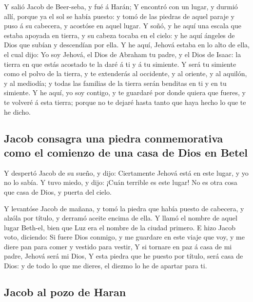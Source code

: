  Y salió Jacob de Beer-seba, y fué á Harán;  Y
encontró con un lugar, y durmió allí, porque ya el sol se había puesto:
y tomó de las piedras de aquel paraje y puso á su cabecera, y acostóse
en aquel lugar.  Y soñó, y he aquí una escala que estaba
apoyada en tierra, y su cabeza tocaba en el cielo: y he aquí ángeles de
Dios que subían y descendían por ella.  Y he aquí, Jehová
estaba en lo alto de ella, el cual dijo: Yo soy Jehová, el Dios de
Abraham tu padre, y el Dios de Isaac: la tierra en que estás acostado te
la daré á ti y á tu simiente.  Y será tu simiente como el
polvo de la tierra, y te extenderás al occidente, y al oriente, y al
aquilón, y al mediodía; y todas las familias de la tierra serán benditas
en ti y en tu simiente.  Y he aquí, yo soy contigo, y te
guardaré por donde quiera que fueres, y te volveré á esta tierra; porque
no te dejaré hasta tanto que haya hecho lo que te he dicho.

\hypertarget{jacob-consagra-una-piedra-conmemorativa-como-el-comienzo-de-una-casa-de-dios-en-betel}{%
\subsection{Jacob consagra una piedra conmemorativa como el comienzo de
una casa de Dios en
Betel}\label{jacob-consagra-una-piedra-conmemorativa-como-el-comienzo-de-una-casa-de-dios-en-betel}}

 Y despertó Jacob de su sueño, y dijo: Ciertamente Jehová
está en este lugar, y yo no lo sabía.  Y tuvo miedo, y
dijo: ¡Cuán terrible es este lugar! No es otra cosa que casa de Dios, y
puerta del cielo.

 Y levantóse Jacob de mañana, y tomó la piedra que había
puesto de cabecera, y alzóla por título, y derramó aceite encima de
ella.  Y llamó el nombre de aquel lugar Beth-el, bien que
Luz era el nombre de la ciudad primero.  E hizo Jacob voto,
diciendo: Si fuere Dios conmigo, y me guardare en este viaje que voy, y
me diere pan para comer y vestido para vestir,  Y si
tornare en paz á casa de mi padre, Jehová será mi Dios,  Y
esta piedra que he puesto por título, será casa de Dios: y de todo lo
que me dieres, el diezmo lo he de apartar para ti.

\hypertarget{jacob-al-pozo-de-haran}{%
\subsection{Jacob al pozo de Haran}\label{jacob-al-pozo-de-haran}}

